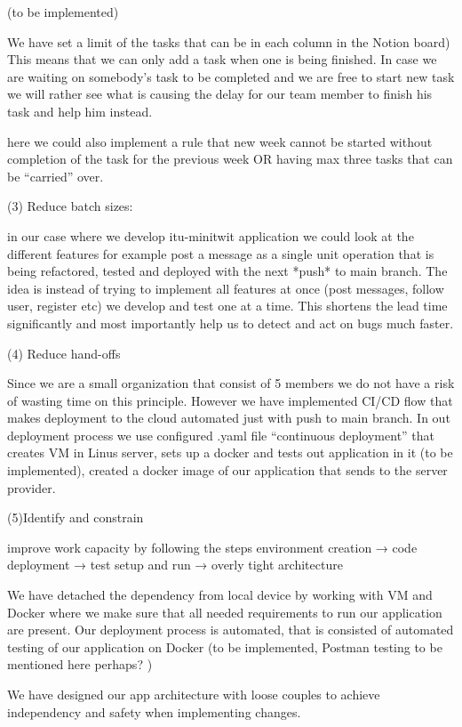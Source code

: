 \documentclass{article}
\begin{document}
(to be implemented)

We have set a limit of the tasks  that can  be in each column in the Notion board) This means that we can only add a task when one is being finished. In case we are waiting on somebody’s task to be completed and we are free to start new task we will rather see what is causing the delay for our team member to finish his task and help him instead. 

here we could also implement a rule that new week cannot be started without completion of the task for the previous week OR having max three tasks that can be “carried” over.

(3) Reduce batch sizes:

in our case where we develop itu-minitwit application we could look at the different features for example post a message as a single unit operation that is being refactored, tested and deployed with the next *push* to main branch. The idea is instead of  trying to implement all features at once (post messages, follow user, register etc) we develop and test one at a time. This shortens the lead time significantly and most importantly help us to detect and act on bugs much faster.

(4) Reduce hand-offs

Since we are a small organization that consist of 5 members we do not have a risk of wasting time on this principle. However we have implemented CI/CD flow that makes deployment to the cloud automated just with push to main branch. In out deployment process we use configured .yaml file “continuous deployment” that creates VM in Linus server, sets up a docker and tests out application in it (to be implemented), created a docker image of our application that sends to the server provider.

(5)Identify and constrain

improve work capacity by following the steps environment creation → code deployment → test setup and run → overly tight architecture

We have detached the dependency from local device by working with VM and Docker where we make sure that all needed requirements to run our application are present. Our deployment process is automated, that is consisted of automated testing of our application on Docker (to be implemented, Postman testing to be mentioned here perhaps? )

We have designed our app architecture with loose couples to achieve independency and safety when implementing changes.
\end{document}
